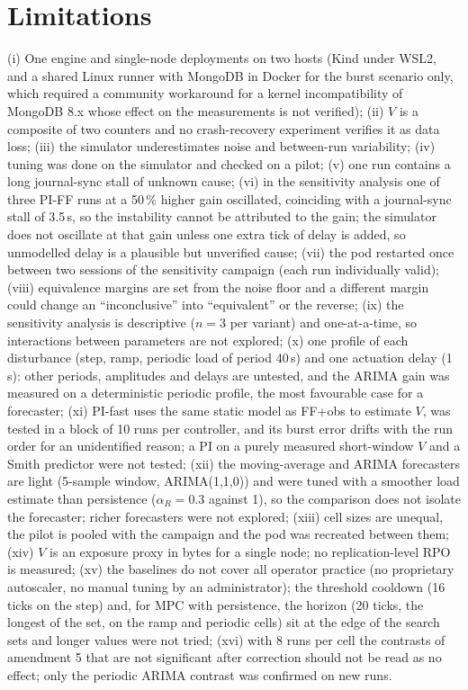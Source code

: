 \documentclass[smallextended]{svjour3}
\begin{document}
\section{Limitations}\label{sec:limits}
(i) One engine and single-node deployments on two hosts (Kind under WSL2, and a shared Linux runner with MongoDB in Docker for the burst scenario only, which required a community workaround for a kernel incompatibility of MongoDB 8.x whose effect on the measurements is not verified); (ii) $V$ is a composite of two counters and no crash-recovery experiment verifies it as data loss;
(iii) the simulator underestimates noise and between-run variability; (iv) tuning was done on the simulator and checked on a pilot; (v) one run contains a long journal-sync stall of unknown cause;
(vi) in the sensitivity analysis one of three PI-FF runs at a 50\,\% higher gain oscillated, coinciding with a journal-sync stall of 3.5\,s, so the instability cannot be attributed to the gain; the simulator does not oscillate at that gain unless one extra tick of delay is added, so unmodelled delay is a plausible but unverified cause; (vii) the pod restarted once between two sessions of the sensitivity campaign (each run individually valid); (viii) equivalence margins are set from the noise floor and a different margin could change an ``inconclusive'' into ``equivalent'' or the reverse; (ix) the sensitivity analysis is descriptive ($n=3$ per variant) and one-at-a-time, so interactions between parameters are not explored;
(x) one profile of each disturbance (step, ramp, periodic load of period 40\,s) and one actuation delay (1\,s): other periods, amplitudes and delays are untested, and the ARIMA gain was measured on a deterministic periodic profile, the most favourable case for a forecaster;
(xi) PI-fast uses the same static model as FF+obs to estimate $V$, was tested in a block of 10 runs per controller, and its burst error drifts with the run order for an unidentified reason; a PI on a purely measured short-window $V$ and a Smith predictor were not tested;
(xii) the moving-average and ARIMA forecasters are light (5-sample window, ARIMA(1,1,0)) and were tuned with a smoother load estimate than persistence ($\alpha_R=0.3$ against 1), so the comparison does not isolate the forecaster; richer forecasters were not explored;
(xiii) cell sizes are unequal, the pilot is pooled with the campaign and the pod was recreated between them;
(xiv) $V$ is an exposure proxy in bytes for a single node; no replication-level RPO is measured;
(xv) the baselines do not cover all operator practice (no proprietary autoscaler, no manual tuning by an administrator); the threshold cooldown (16 ticks on the step) and, for MPC with persistence, the horizon (20 ticks, the longest of the set, on the ramp and periodic cells) sit at the edge of the search sets and longer values were not tried;
(xvi) with 8 runs per cell the contrasts of amendment 5 that are not significant after correction should not be read as no effect; only the periodic ARIMA contrast was confirmed on new runs.
\end{document}

